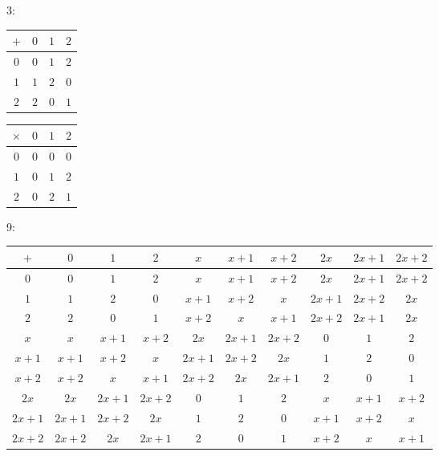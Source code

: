 		3:
		\begin{center}
			\begin{tabular}{|c|c|c|c|}
				\hline
				$+ $&$ 0 $&$ 1 $&$ 2$\\
				\hline
				$0 $&$ 0 $&$ 1 $&$ 2$\\
				\hline
				$1 $&$ 1 $&$ 2 $&$ 0$\\
				\hline
				$2 $&$ 2 $&$ 0 $&$ 1$\\
				\hline
			\end{tabular}
		\end{center}
		\begin{center}
			\begin{tabular}{|c|c|c|c|}
				\hline
				$\times $&$ 0 $&$ 1 $&$ 2$\\
				\hline
				$0 $&$ 0 $&$ 0 $&$ 0$\\
				\hline
				$1 $&$ 0 $&$ 1 $&$ 2$\\
				\hline
				$2 $&$ 0 $&$ 2 $&$ 1$\\
				\hline
			\end{tabular}
		\end{center}
		9:
		\begin{center}
			\begin{tabular}{|c|c|c|c|c|c|c|c|c|c|}
				\hline
				$+ $&$ 0 $&$ 1 $&$ 2 $&$ x $&$ x+1 $&$ x+2 $&$ 2x $&$ 2x+1 $&$ 2x+2$\\
				\hline
				$0 $&$ 0 $&$ 1 $&$ 2 $&$ x $&$ x+1 $&$ x+2 $&$ 2x $&$ 2x+1 $&$ 2x+2$\\
				\hline
				$1 $&$ 1 $&$ 2 $&$ 0 $&$ x+1 $&$ x+2 $&$ x $&$ 2x+1 $&$ 2x+2 $&$ 2x$\\
				\hline
				$2 $&$ 2 $&$ 0 $&$ 1 $&$ x+2 $&$ x $&$ x+1 $&$ 2x+2 $&$ 2x+1 $&$ 2x$\\
				\hline
				$x $&$ x $&$ x+1 $&$ x+2 $&$ 2x $&$ 2x+1 $&$ 2x+2 $&$ 0 $&$ 1 $&$ 2$\\
				\hline
				$x+1 $&$ x+1 $&$ x+2 $&$ x $&$ 2x+1 $&$ 2x+2 $&$ 2x $&$ 1 $&$ 2 $&$ 0$\\
				\hline
				$x+2 $&$ x+2 $&$ x $&$ x+1 $&$ 2x+2 $&$ 2x $&$ 2x+1 $&$ 2 $&$ 0 $&$ 1$\\
				\hline
				$2x $&$ 2x $&$ 2x+1 $&$ 2x+2 $&$ 0 $&$ 1 $&$ 2 $&$ x $&$ x+1 $&$ x+2$\\
				\hline
				$2x+1 $&$ 2x+1 $&$ 2x+2 $&$ 2x $&$ 1 $&$ 2 $&$ 0 $&$ x+1 $&$ x+2 $&$ x$\\
				\hline
				$2x+2 $&$ 2x+2 $&$ 2x $&$ 2x+1 $&$ 2 $&$ 0 $&$ 1 $&$ x+2 $&$ x $&$ x+1$\\
				\hline
			\end{tabular}
		\end{center}
